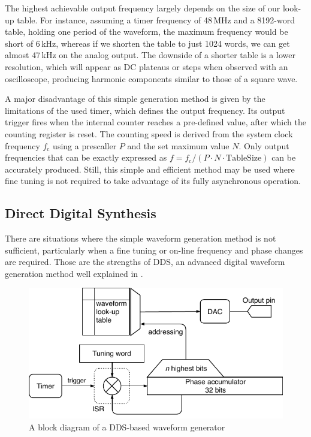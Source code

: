 The highest achievable output frequency largely depends on the size of our look-up table. For instance, assuming a timer frequency of 48\,MHz and a 8192-word table, holding one period of the waveform, the maximum frequency would be short of 6\,kHz, whereas if we shorten the table to just 1024 words, we can get almost 47\,kHz on the analog output. The downside of a shorter table is a lower resolution, which will appear as \gls{DC} plateaus or steps when observed with an oscilloscope, producing harmonic components similar to those of a square wave.

A major disadvantage of this simple generation method is given by the limitations of the used timer, which defines the output frequency. Its output trigger fires when the internal counter reaches a pre-defined value, after which the counting register is reset. The counting speed is derived from the system clock frequency $f_\mathrm{c}$ using a prescaller $P$ and the set maximum value $N$. Only output frequencies that can be exactly expressed as $f=f_\mathrm{c}/(P\cdot N \cdot \mathrm{TableSize})$ can be accurately produced. Still, this simple and efficient method may be used where fine tuning is not required to take advantage of its fully asynchronous operation.

\subsection{Direct Digital Synthesis} \label{sec:theory-dac-dds}

There are situations where the simple waveform generation method is not sufficient, particularly when a fine tuning or on-line frequency and phase changes are required. Those are the strengths of \gls{DDS}, an advanced digital waveform generation method well explained in \cite{all-about-dds}.

\begin{figure}[h]
	\centering
	\includegraphics[scale=1] {img/wavegen-dds.pdf}
	\caption{\label{fig:wavegen-dds}A block diagram of a DDS-based waveform generator}
\end{figure}

